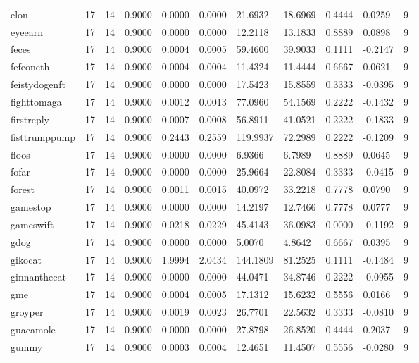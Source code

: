 \begin{table}[htbp]
\begin{tabular}{lllllllllll}
elon & 17 & 14 & 0.9000 & 0.0000 & 0.0000 & 21.6932 & 18.6969 & 0.4444 & 0.0259 & 9 \\
eyeearn & 17 & 14 & 0.9000 & 0.0000 & 0.0000 & 12.2118 & 13.1833 & 0.8889 & 0.0898 & 9 \\
feces & 17 & 14 & 0.9000 & 0.0004 & 0.0005 & 59.4600 & 39.9033 & 0.1111 & -0.2147 & 9 \\
fefeoneth & 17 & 14 & 0.9000 & 0.0004 & 0.0004 & 11.4324 & 11.4444 & 0.6667 & 0.0621 & 9 \\
feistydogenft & 17 & 14 & 0.9000 & 0.0000 & 0.0000 & 17.5423 & 15.8559 & 0.3333 & -0.0395 & 9 \\
fighttomaga & 17 & 14 & 0.9000 & 0.0012 & 0.0013 & 77.0960 & 54.1569 & 0.2222 & -0.1432 & 9 \\
firstreply & 17 & 14 & 0.9000 & 0.0007 & 0.0008 & 56.8911 & 41.0521 & 0.2222 & -0.1833 & 9 \\
fisttrumppump & 17 & 14 & 0.9000 & 0.2443 & 0.2559 & 119.9937 & 72.2989 & 0.2222 & -0.1209 & 9 \\
floos & 17 & 14 & 0.9000 & 0.0000 & 0.0000 & 6.9366 & 6.7989 & 0.8889 & 0.0645 & 9 \\
fofar & 17 & 14 & 0.9000 & 0.0000 & 0.0000 & 25.9664 & 22.8084 & 0.3333 & -0.0415 & 9 \\
forest & 17 & 14 & 0.9000 & 0.0011 & 0.0015 & 40.0972 & 33.2218 & 0.7778 & 0.0790 & 9 \\
gamestop & 17 & 14 & 0.9000 & 0.0000 & 0.0000 & 14.2197 & 12.7466 & 0.7778 & 0.0777 & 9 \\
gameswift & 17 & 14 & 0.9000 & 0.0218 & 0.0229 & 45.4143 & 36.0983 & 0.0000 & -0.1192 & 9 \\
gdog & 17 & 14 & 0.9000 & 0.0000 & 0.0000 & 5.0070 & 4.8642 & 0.6667 & 0.0395 & 9 \\
gikocat & 17 & 14 & 0.9000 & 1.9994 & 2.0434 & 144.1809 & 81.2525 & 0.1111 & -0.1484 & 9 \\
ginnanthecat & 17 & 14 & 0.9000 & 0.0000 & 0.0000 & 44.0471 & 34.8746 & 0.2222 & -0.0955 & 9 \\
gme & 17 & 14 & 0.9000 & 0.0004 & 0.0005 & 17.1312 & 15.6232 & 0.5556 & 0.0166 & 9 \\
groyper & 17 & 14 & 0.9000 & 0.0019 & 0.0023 & 26.7701 & 22.5632 & 0.3333 & -0.0810 & 9 \\
guacamole & 17 & 14 & 0.9000 & 0.0000 & 0.0000 & 27.8798 & 26.8520 & 0.4444 & 0.2037 & 9 \\
gummy & 17 & 14 & 0.9000 & 0.0003 & 0.0004 & 12.4651 & 11.4507 & 0.5556 & -0.0280 & 9 \\

\end{tabular}
\end{table}
